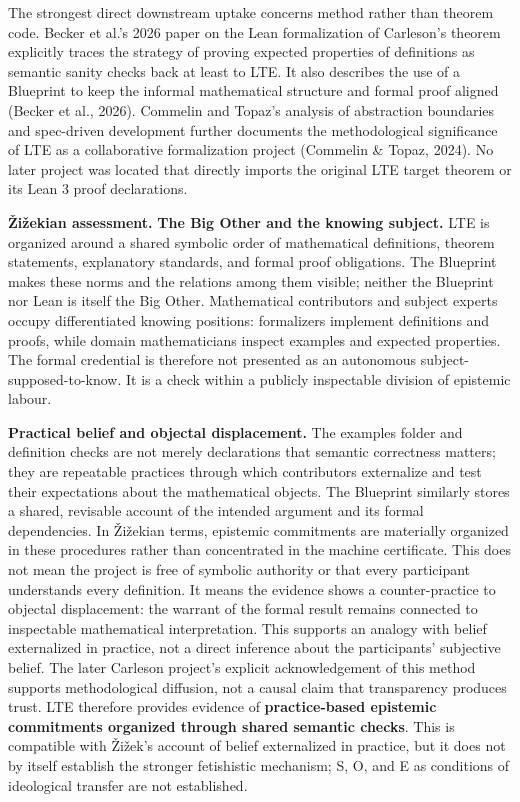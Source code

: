 \documentclass[sn-apa]{sn-jnl}
\begin{document}
The strongest direct downstream uptake concerns method rather than theorem code. Becker et al.’s 2026 paper on the Lean formalization of Carleson’s theorem explicitly traces the strategy of proving expected properties of definitions as semantic sanity checks back at least to LTE. It also describes the use of a Blueprint to keep the informal mathematical structure and formal proof aligned (Becker et al., 2026). Commelin and Topaz’s analysis of abstraction boundaries and spec-driven development further documents the methodological significance of LTE as a collaborative formalization project (Commelin \& Topaz, 2024). No later project was located that directly imports the original LTE target theorem or its Lean 3 proof declarations.

\textbf{Žižekian assessment.} \textbf{The Big Other and the knowing subject.} LTE is organized around a shared symbolic order of mathematical definitions, theorem statements, explanatory standards, and formal proof obligations. The Blueprint makes these norms and the relations among them visible; neither the Blueprint nor Lean is itself the Big Other. Mathematical contributors and subject experts occupy differentiated knowing positions: formalizers implement definitions and proofs, while domain mathematicians inspect examples and expected properties. The formal credential is therefore not presented as an autonomous subject-supposed-to-know. It is a check within a publicly inspectable division of epistemic labour.

\textbf{Practical belief and objectal displacement.} The examples folder and definition checks are not merely declarations that semantic correctness matters; they are repeatable practices through which contributors externalize and test their expectations about the mathematical objects. The Blueprint similarly stores a shared, revisable account of the intended argument and its formal dependencies. In Žižekian terms, epistemic commitments are materially organized in these procedures rather than concentrated in the machine certificate. This does not mean the project is free of symbolic authority or that every participant understands every definition. It means the evidence shows a counter-practice to objectal displacement: the warrant of the formal result remains connected to inspectable mathematical interpretation. This supports an analogy with belief externalized in practice, not a direct inference about the participants’ subjective belief. The later Carleson project’s explicit acknowledgement of this method supports methodological diffusion, not a causal claim that transparency produces trust. LTE therefore provides evidence of \textbf{practice-based epistemic commitments organized through shared semantic checks}. This is compatible with Žižek’s account of belief externalized in practice, but it does not by itself establish the stronger fetishistic mechanism; S, O, and E as conditions of ideological transfer are not established.
\end{document}
